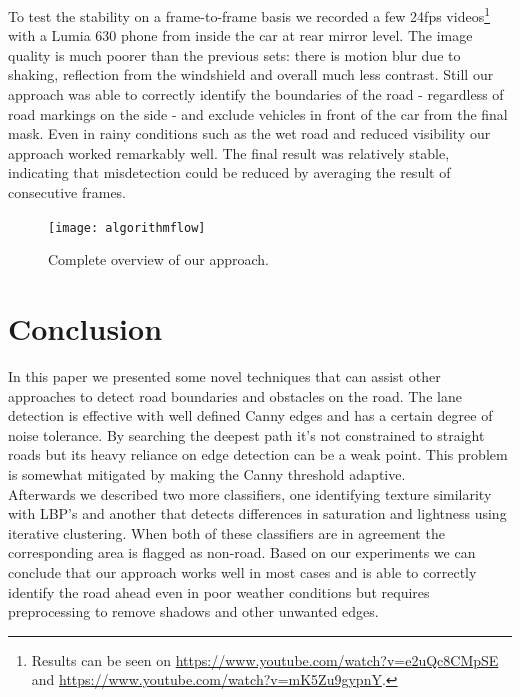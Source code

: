 \documentclass[oneside,english]{llncs}
\begin{document}
To test the stability on a frame-to-frame basis we recorded a few 24fps videos\footnote{Results can be seen on \url{https://www.youtube.com/watch?v=e2uQc8CMpSE} and \url{https://www.youtube.com/watch?v=mK5Zu9gypnY}.} 
with a Lumia 630 phone from inside the car at rear mirror level. The image quality is much poorer than the previous sets: there is motion blur due to shaking, reflection from the windshield and overall much less contrast. Still our approach was able to correctly identify the boundaries of the road - regardless of road markings on the side - and exclude vehicles in front of the car from the final mask. Even in rainy conditions such as the wet road and reduced visibility our approach worked remarkably well. The final result was relatively stable, indicating that misdetection could be reduced by averaging the result of consecutive frames.

\begin{figure}[H]
    \centering
    \texttt{[image: algorithmflow]}
    \caption{Complete overview of our approach.
    \label{fig:AlgorithmOverview}}
    \vspace{-1em} %
\end{figure}

\section{Conclusion}\label{Conclusion}

In this paper we presented some novel techniques that can assist other approaches to detect road boundaries and obstacles on the road. The lane detection is effective with well defined Canny edges and has a certain degree of noise tolerance. By searching the deepest path it's not constrained to straight roads but its heavy reliance on edge detection can be a weak point. This problem is somewhat mitigated by making the Canny threshold adaptive.\\
Afterwards we described two more classifiers, one identifying texture similarity with LBP's and another that detects differences in saturation and lightness using iterative clustering. When both of these classifiers are in agreement the corresponding area is flagged as non-road. Based on our experiments we can conclude that our approach works well in most cases and is able to correctly identify the road ahead even in poor weather conditions but requires preprocessing to remove shadows and other unwanted edges.
\end{document}

